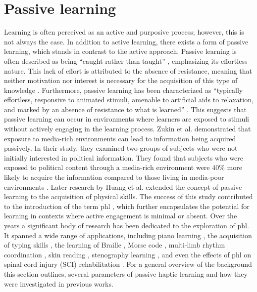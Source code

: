 \section{Passive learning}
Learning is often perceived as an active and purposive process; however, this is not always the case. In addition to active learning, there exists a form of passive learning, which stands in contrast to the active approach. Passive learning is often described as being \enquote{caught rather than taught} \cite{krugman1970passive}, emphasizing its effortless nature. This lack of effort is attributed to the absence of resistance, meaning that neither motivation nor interest is necessary for the acquisition of this type of knowledge \cite{Zukin1984}.
Furthermore, passive learning has been characterized as \enquote{typically effortless, responsive to animated stimuli, amenable to artificial aids to relaxation, and marked by an absence of resistance to what is learned} \cite{Huang2008,krugman1970passive}. This suggests that passive learning can occur in environments where learners are exposed to stimuli without actively engaging in the learning process.
Zukin et al. \cite{Zukin1984} demonstrated that exposure to media-rich environments can lead to information being acquired passively. In their study, they examined two groups of subjects who were not initially interested in political information. They found that subjects who were exposed to political content through a media-rich environment were 40\% more likely to acquire the information compared to those living in media-poor environments \cite{zukin1984passive, Huang2008}.
Later research by Huang et al. \cite{Huang2008} extended the concept of passive learning to the acquisition of physical skills. The success of this study contributed to the introduction of the term \gls{phl} \cite{Pescara2019}, which further encapsulates the potential for learning in contexts where active engagement is minimal or absent.
Over the years a significant body of research has been dedicated to the exploration of \gls{phl}. It spanned a wide range of applications, including piano learning \cite{Huang2008, Kohlsdorf2010, Seim2015b, Donchev2021, Fang2023a, Fang2023}, the acquisition of typing skills \cite{Seim2014, Seim2017, Seim2014a, Learning2024}, the learning of Braille \cite{Seim2014a, Learning2024}, Morse code \cite{Seim2016a, Seim2018, Pescara2019}, multi-limb rhythm coordination \cite{Bouwer2011, Holland2010}, skin reading \cite{Luzhnica2016, Luzhnica2018}, stenography learning \cite{Aveni2019,Aveni2019a}, and even the effects of \gls{phl} on spinal cord injury (SCI) rehabilitation \cite{Markow2010}.
For a general overview of the background this section outlines, several parameters of passive haptic learning and how they were investigated in previous works.

